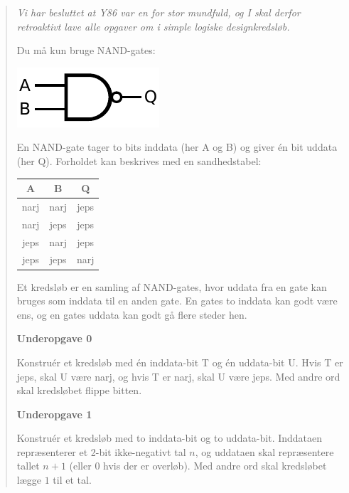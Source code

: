 \begin{quote}

{\em Vi har besluttet at Y86 var en for stor mundfuld, og I skal derfor
retroaktivt lave alle opgaver om i simple logiske designkredsløb.

Du må kun bruge NAND-gates:
\begin{center}
\includegraphics[width=.3\textwidth]{img/NAND-ANSI-Labelled}
\end{center}

En NAND-gate tager to bits inddata (her A og B) og giver én bit uddata (her Q).
Forholdet kan beskrives med en sandhedstabel:

\begin{center}
\begin{tabular}{cc|c}
  A & B & Q\\\hline
  narj & narj & jeps\\
  narj & jeps & jeps\\
  jeps & narj & jeps\\
  jeps & jeps & narj
\end{tabular}
\end{center}

Et kredsløb er en samling af NAND-gates, hvor uddata fra en gate kan bruges som
inddata til en anden gate.  En gates to inddata kan godt være ens, og en gates
uddata kan godt gå flere steder hen.

\vspace{5mm}
\textbf{Underopgave 0}

Konstruér et kredsløb med én inddata-bit T og én uddata-bit U.  Hvis T er jeps,
skal U være narj, og hvis T er narj, skal U være jeps.  Med andre ord skal
kredsløbet flippe bitten.

\vspace{5mm}
\textbf{Underopgave 1}

Konstruér et kredsløb med to inddata-bit og to uddata-bit.  Inddataen
repræsenterer et 2-bit ikke-negativt tal $n$, og uddataen skal repræsentere
tallet $n + 1$ (eller $0$ hvis der er overløb).  Med andre ord skal kredsløbet
lægge $1$ til et tal.}
\end{quote}

